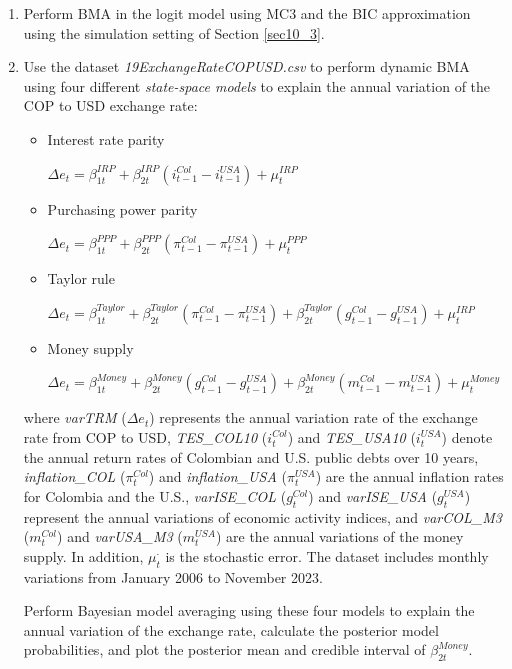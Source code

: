 \begin{enumerate}
\item Perform BMA in the logit model using MC3 and the BIC approximation using the simulation setting of Section \ref{sec10_3}.

\item Use the dataset \textit{19ExchangeRateCOPUSD.csv} to perform dynamic BMA using four different \textit{state-space models} to explain the annual variation of the COP to USD exchange rate: 
\begin{itemize}
	\item Interest rate parity
	
	$\Delta e_t = \beta_{1t}^{IRP} + \beta_{2t}^{IRP} (i_{t-1}^{Col}-i_{t-1}^{USA})+\mu_{t}^{IRP}$ 
	\item Purchasing power parity
	
	$\Delta e_t = \beta_{1t}^{PPP} + \beta_{2t}^{PPP} (\pi_{t-1}^{Col}-\pi_{t-1}^{USA})+\mu_{t}^{PPP}$
	\item Taylor rule
	
	$\Delta e_t = \beta_{1t}^{Taylor} + \beta_{2t}^{Taylor} (\pi_{t-1}^{Col}-\pi_{t-1}^{USA})+\beta_{2t}^{Taylor} (g_{t-1}^{Col}-g_{t-1}^{USA})+\mu_{t}^{IRP}$
	\item Money supply
	
	$\Delta e_t = \beta_{1t}^{Money} + \beta_{2t}^{Money} (g_{t-1}^{Col}-g_{t-1}^{USA})+\beta_{2t}^{Money} (m_{t-1}^{Col}-m_{t-1}^{USA})+\mu_{t}^{Money}$   
\end{itemize}
where \textit{varTRM} ($\Delta e_t$) represents the annual variation rate of the exchange rate from COP to USD, \textit{TES\_COL10} ($i_{t}^{Col}$) and \textit{TES\_USA10} ($i_{t}^{USA}$) denote the annual return rates of Colombian and U.S. public debts over 10 years, \textit{inflation\_COL} ($\pi_{t}^{Col}$) and \textit{inflation\_USA} ($\pi_{t}^{USA}$) are the annual inflation rates for Colombia and the U.S., \textit{varISE\_COL} ($g_{t}^{Col}$) and \textit{varISE\_USA} ($g_{t}^{USA}$) represent the annual variations of economic activity indices, and \textit{varCOL\_M3} ($m_{t}^{Col}$) and \textit{varUSA\_M3} ($m_{t}^{USA}$) are the annual variations of the money supply. In addition, $\mu_{t}^{\cdot}$ is the stochastic error. The dataset includes monthly variations from January 2006 to November 2023.

Perform Bayesian model averaging using these four models to explain the annual variation of the exchange rate, calculate the posterior model probabilities, and plot the posterior mean and credible interval of $\beta_{2t}^{Money}$.   


\end{enumerate}
